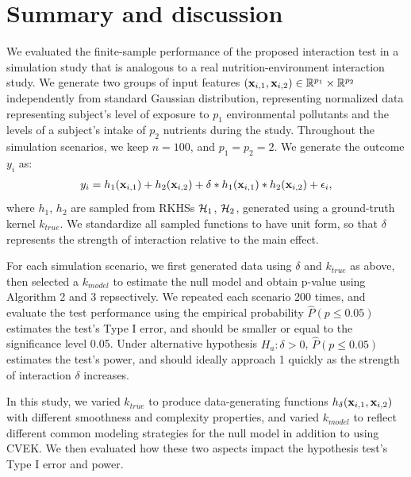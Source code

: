 \documentclass[article]{jss}
\begin{document}
\section{Summary and discussion} \label{sec:summary}
We evaluated the finite-sample performance of the proposed interaction test in a simulation study that is analogous to a real nutrition-environment interaction study. We generate two groups of input features $({\bf x}_{i, 1}, {\bf x}_{i,2}) \in \mathbb{R}^{p_1} \times \mathbb{R}^{p_2}$ independently from standard Gaussian distribution, representing normalized data representing subject's level of exposure to $p_1$ environmental pollutants and the levels of a subject's intake of $p_2$ nutrients during the study. Throughout the simulation scenarios, we keep $n=100$, and $p_1=p_2=2$. We generate the outcome $y_i$ as:
\begin{align*}
y_i=h_1({\bf x}_{i, 1})+h_2({\bf x}_{i, 2})+\delta * h_1({\bf x}_{i, 1}) * h_2({\bf x}_{i, 2})+\epsilon_i,
\end{align*}
where $h_1$, $h_2$ are sampled from RKHSs ${\cal H}_1$, ${\cal H}_2$, generated using a ground-truth kernel $k_{true}$. We standardize all sampled functions to have unit form, so that $\delta$ represents the strength of interaction relative to the main effect.

For each simulation scenario, we first generated data using $\delta$ and $k_{true}$ as above, then selected a $k_{model}$ to estimate the null model and obtain p-value using Algorithm 2 and 3 repsectively. We repeated each scenario 200 times, and evaluate the test performance using the empirical probability $\hat{P}(p\leq 0.05)$ estimates the test's Type I error, and should be smaller or equal to the significance level 0.05. Under alternative hypothesis $H_a: \delta>0$, $\hat{P}(p\leq 0.05)$ estimates the test's power, and should ideally approach 1 quickly as the strength of interaction $\delta$ increases.

In this study, we varied $k_{true}$ to produce data-generating functions $h_\delta({\bf x}_{i, 1}, {\bf x}_{i, 2})$ with different smoothness and complexity properties, and varied $k_{model}$ to reflect different common modeling strategies for the null model in addition to using CVEK. We then evaluated how these two aspects impact the hypothesis test's Type I error and power.\\
\end{document}
